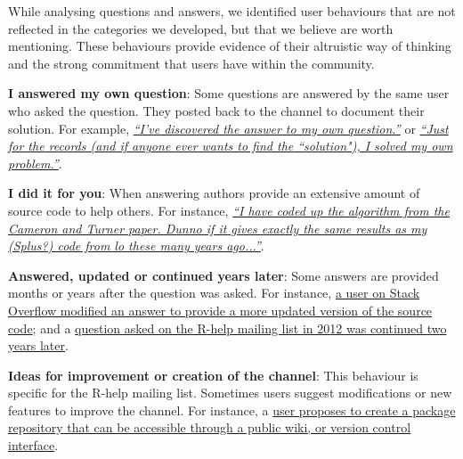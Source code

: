 \documentclass{sig-alternate-05-2015}
\begin{document}
	While analysing questions and answers, we identified user behaviours that are not reflected in the categories we developed, but that we believe are worth mentioning.
	These behaviours provide evidence of their altruistic way of thinking and the strong commitment that users have within the community.
	\begin{packed_enum}
		\item \textbf{I answered my own question}: Some questions are answered by the same user who asked the question. They posted back to the channel to document their solution.
		For example, \textit{\href{http://goo.gl/FG59Mw}{``I've discovered the answer to my own question.''}} or \textit{\href{https://goo.gl/r3z0DX}{``Just for the records (and if anyone ever wants to find the ``solution"), I solved my own problem.''}}.

		\item \textbf{I did it for you}: When answering authors provide an extensive amount of source code to help others. For instance, \textit{\href{http://goo.gl/GXWGG3}{``I have coded up the algorithm from the Cameron and Turner paper. Dunno if it gives exactly the same results as my (Splus?) code from lo these many years ago...''}}.

		\item \textbf{Answered, updated or continued years later}: Some answers are provided months or years after the question was asked.
		For instance, \href{http://goo.gl/k6ZARR}{a user on Stack Overflow modified an answer to provide a more updated version of the source code}; and a \href{http://goo.gl/kgSHZv}{question asked on the R-help mailing list in 2012 was continued two years later}.

		\item \textbf{Ideas for improvement or creation of the channel}: This behaviour is specific for the R-help mailing list. Sometimes users suggest modifications or new features to improve the channel. For instance, a \href{http://goo.gl/p0IunD}{user proposes to create a package repository that can be accessible through a public wiki, or version control interface}.
	\end{packed_enum}
\end{document}

